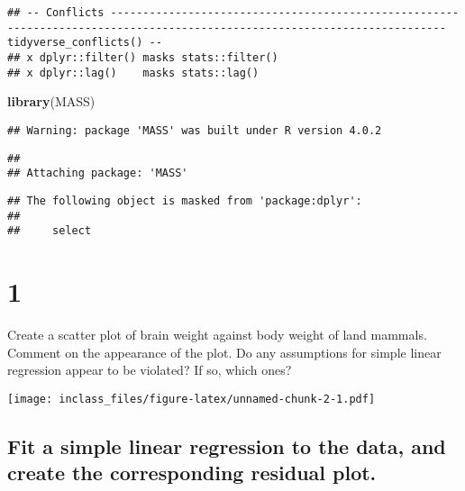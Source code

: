 \documentclass[]{article}
\newenvironment{Shaded}{\begin{snugshade}}{\end{snugshade}}
\newcommand{\KeywordTok}[1]{\textcolor[rgb]{0.13,0.29,0.53}{\textbf{#1}}}
\newcommand{\StringTok}[1]{\textcolor[rgb]{0.31,0.60,0.02}{#1}}
\newcommand{\OperatorTok}[1]{\textcolor[rgb]{0.81,0.36,0.00}{\textbf{#1}}}
\newcommand{\NormalTok}[1]{#1}
\begin{document}
\begin{verbatim}
## -- Conflicts -------------------------------------------------------------------------------------------------------------------------- tidyverse_conflicts() --
## x dplyr::filter() masks stats::filter()
## x dplyr::lag()    masks stats::lag()
\end{verbatim}

\begin{Shaded}
\begin{Highlighting}[]
\KeywordTok{library}\NormalTok{(MASS)}
\end{Highlighting}
\end{Shaded}

\begin{verbatim}
## Warning: package 'MASS' was built under R version 4.0.2
\end{verbatim}

\begin{verbatim}
## 
## Attaching package: 'MASS'
\end{verbatim}

\begin{verbatim}
## The following object is masked from 'package:dplyr':
## 
##     select
\end{verbatim}

\section{1}\label{section}

Create a scatter plot of brain weight against body weight of land
mammals. Comment on the appearance of the plot. Do any assumptions for
simple linear regression appear to be violated? If so, which ones?

\begin{Shaded}
\end{Shaded}

\texttt{[image: inclass\_files/figure-latex/unnamed-chunk-2-1.pdf]}

\subsection{Fit a simple linear regression to the data, and create the
corresponding residual
plot.}\label{fit-a-simple-linear-regression-to-the-data-and-create-the-corresponding-residual-plot.}
\end{document}
